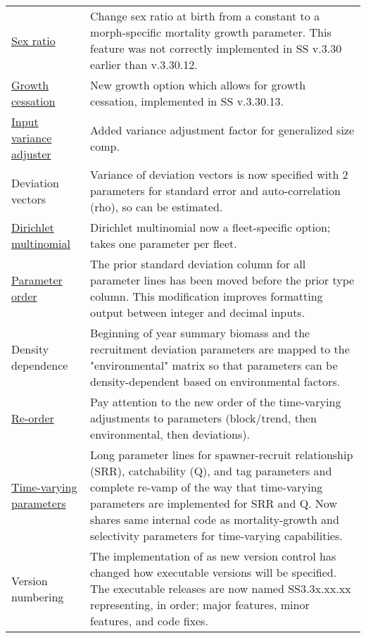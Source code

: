 \begin{center}
{\begin{longtable}{p{1.75cm} p{9.5cm}}
		\multicolumn{1}{l}{\hyperlink{SexRatio}{Sex ratio}} & 
			    Change sex ratio at birth from a constant to a morph-specific mortality growth parameter. This feature was not correctly implemented in SS v.3.30 earlier than v.3.30.12. \\

		\multicolumn{1}{l}{\hyperlink{GrowthCessation}{Growth cessation}} & 
		    New growth option which allows for growth cessation, implemented in SS v.3.30.13. \\

		\multicolumn{1}{l}{\hyperlink{GcompVar}{Input variance adjuster}} & 
				Added variance adjustment factor for generalized size comp. \\
			
		\multicolumn{1}{l}{Deviation vectors} & 
				Variance of deviation vectors is now specified with 2 parameters for standard error and auto-correlation (rho), so can be estimated.\\
				
		\multicolumn{1}{l}{\hyperlink{Dirichlet}{Dirichlet multinomial}} & 
				Dirichlet multinomial now a fleet-specific option; takes one parameter per fleet. \\

		\multicolumn{1}{l}{\hyperlink{paraOrder}{Parameter order}} & The prior standard deviation column for all parameter lines has been moved before the prior type column.  This modification improves formatting output between integer and decimal inputs.\\ 

		\multicolumn{1}{l}{Density dependence} & 
				Beginning of year summary biomass and the recruitment deviation parameters are mapped to the "environmental" matrix so that parameters can be density-dependent based on environmental factors.\\
				
		\multicolumn{1}{l}{\hyperlink{tvOrder}{Re-order}} & 
				Pay attention to the new order of the time-varying adjustments to parameters (block/trend, then environmental, then deviations). \\
			
		\multicolumn{1}{l}{\hyperlink{time-vary}{Time-varying parameters}} & 
				Long parameter lines for spawner-recruit relationship (SRR), catchability (Q), and tag parameters and complete re-vamp of the way that time-varying parameters are implemented for SRR and Q.  Now shares same internal code as mortality-growth and selectivity parameters for time-varying capabilities.\\

		\multicolumn{1}{l}{Version numbering}	& The implementation of as new version control has changed how executable versions will be specified. The executable releases are now named SS3.3x.xx.xx representing, in order; major features, minor features, and code fixes. \\
		 \hline
	\end{longtable}}
\end{center}


